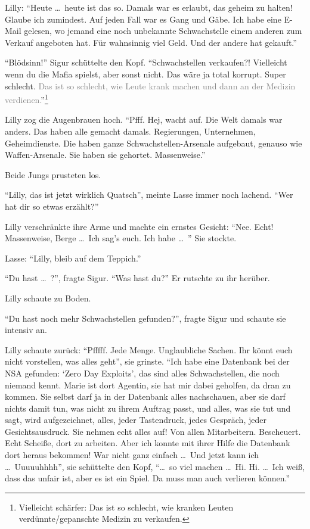 Lilly: \enquote{Heute \dots\  heute ist das so.
Damals war es erlaubt, das geheim zu halten! Glaube ich zumindest.
Auf jeden Fall war es Gang und Gäbe.
Ich habe eine E-Mail gelesen, wo jemand eine noch unbekannte Schwachstelle einem anderen zum Verkauf angeboten hat.
Für wahnsinnig viel Geld.
Und der andere hat gekauft.}

\enquote{Blödsinn!} Sigur schüttelte den Kopf.
\enquote{Schwachstellen verkaufen?! Vielleicht wenn du die Mafia spielst, aber sonst nicht.
Das wäre ja total korrupt.
Super schlecht.
\textcolor{gray}{Das ist so schlecht, wie Leute krank machen und dann an der Medizin verdienen.}}\footnote{Vielleicht schärfer: Das ist so schlecht, wie kranken Leuten verdünnte/gepanschte Medizin zu verkaufen.}

Lilly zog die Augenbrauen hoch.
\enquote{Pfff.
Hej, wacht auf.
Die Welt damals war anders.
Das haben alle gemacht damals.
Regierungen, Unternehmen, Geheimdienste.
Die haben ganze Schwachstellen-Arsenale aufgebaut, genauso wie Waffen-Arsenale.
Sie haben sie gehortet.
Massenweise.}

Beide Jungs prusteten los.

\enquote{Lilly, das ist jetzt wirklich Quatsch}, meinte Lasse immer noch lachend.
\enquote{Wer hat dir  so etwas erzählt?}

Lilly verschränkte ihre Arme und machte ein ernstes Gesicht: \enquote{Nee.
Echt! Massenweise, Berge \dots\  Ich sag's euch.
Ich habe \dots\ } Sie stockte.

Lasse: \enquote{Lilly, bleib auf dem Teppich.}

\enquote{Du hast \dots\ ?}, fragte Sigur.
\enquote{Was hast du?} Er rutschte zu ihr herüber.

Lilly schaute zu Boden.

\enquote{Du hast noch mehr Schwachstellen gefunden?}, fragte Sigur und schaute sie intensiv an.

Lilly schaute zurück: \enquote{Pfffff.
Jede Menge.
Unglaubliche Sachen.
Ihr könnt euch nicht vorstellen, was alles geht}, sie grinste.
\enquote{Ich habe eine Datenbank bei der NSA gefunden: \enquote{Zero Day Exploits}, das sind alles Schwachstellen, die noch niemand kennt.
Marie ist dort Agentin, sie hat mir dabei geholfen, da dran zu kommen.
Sie selbst darf ja in der Datenbank alles nachschauen, aber sie darf nichts damit tun, was nicht zu ihrem Auftrag passt, und alles, was sie tut und sagt, wird aufgezeichnet, alles, jeder Tastendruck, jedes Gespräch, jeder Gesichtsausdruck.
Sie nehmen echt alles auf! Von allen Mitarbeitern.
Bescheuert.
Echt Scheiße, dort zu arbeiten.
Aber ich konnte mit ihrer Hilfe die Datenbank dort heraus bekommen! War nicht ganz einfach \dots\  Und jetzt kann ich \dots\  Uuuuuhhhh}, sie schüttelte den Kopf, \enquote{\dots\  so viel machen \dots\  Hi.
Hi.
\dots\  Ich weiß, dass das unfair ist, aber es ist ein Spiel.
Da muss man auch verlieren können.}


